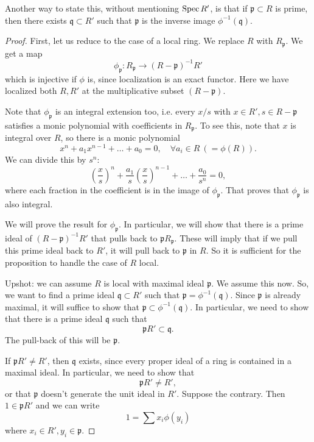 Another way to state this, without mentioning $\operatorname{Spec} R'$, is that if
$\mathfrak{p} \subset R$ is prime, then there exists $\mathfrak{q} \subset R'$
such that $\mathfrak{p}$ is the inverse image $\phi^{-1}(\mathfrak{q})$.

\begin{proof}
First, let us reduce to the case of a local ring.
We replace $R$ with $R_{\mathfrak{p}}$.  We get a map
\[ \phi_{\mathfrak{p}}: R_{\mathfrak{p}} \to (R- \mathfrak{p})^{-1} R'  \]
which is injective if $\phi$ is, since localization is an exact functor. Here
we
have localized both $R, R'$ at the multiplicative subset $(R - \mathfrak{p})$.

Note that $\phi_{\mathfrak{p}}$ is an integral extension too, i.e. every $x/s$
with $x \in R', s \in R - \mathfrak{p}$ satisfies a monic polynomial with
coefficients in $R_{\mathfrak{p}}$. To see this, note that $x$ is integral over
$R$, so there is a monic polynomial
\[ x^n + a_1 x^{n-1} + \dots + a_0 = 0, \quad \forall a_i \in R \ (=\phi(R)).
\]
We can divide this by $s^n$:
\[ (\frac{x}{s})^n  + \frac{a_1}{s} (\frac{x}{s})^{n-1} + \dots +
\frac{a_0}{s^n} = 0,  \]
where each fraction in the coefficient is in the image of
$\phi_{\mathfrak{p}}$.
That proves that $\phi_{\mathfrak{p}}$ is also integral.

We will prove the result for $\phi_{\mathfrak{p}}$.  In particular, we
will show
that there is a prime ideal of $(R- \mathfrak{p})^{-1} R'$ that pulls back to
$\mathfrak{p}R_{\mathfrak{p}}$. These will imply that if we pull this prime
ideal back to $R'$, it will pull back to $\mathfrak{p}$ in $R$.
So it is sufficient for the proposition to handle the case of $R$ local.

Upshot: we can assume $R$ is local with maximal ideal $\mathfrak{p}$. We assume
this now.
So, we want to find a prime ideal $\mathfrak{q} \subset R'$ such that
$\mathfrak{p}  = \phi^{-1}(\mathfrak{q})$. Since $\mathfrak{p}$ is already
maximal, it will suffice to show that $\mathfrak{p} \subset
\phi^{-1}(\mathfrak{q})$. In particular, we need to show that there is a prime
ideal $\mathfrak{q}$ such that
\[ \mathfrak{p} R' \subset \mathfrak{q}.  \]
The pull-back of this will be $\mathfrak{p}$.

If $\mathfrak{p}R' \neq R'$, then
$\mathfrak{q}$ exists, since every proper ideal of a ring is contained in a
maximal ideal. In particular, we need to show that
\[ \mathfrak{p} R' \neq R', \]
or that $\mathfrak{p}$ doesn't generate the unit ideal in $R'$. Suppose the
contrary. Then $1 \in \mathfrak{p}R'$ and we can write
\[ 1 = \sum x_i \phi(y_i)  \]
where $x_i \in R', y_i \in \mathfrak{p}$.


\end{proof}
